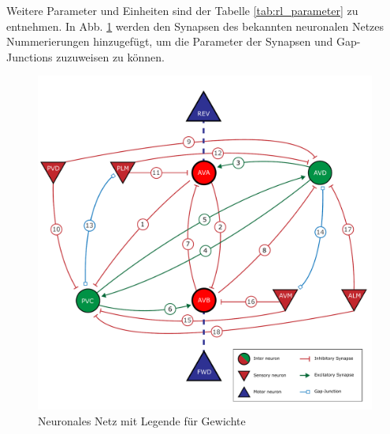 	Weitere Parameter und Einheiten sind der Tabelle \ref{tab:rl_parameter} zu entnehmen. In Abb. \ref{fig:erg_rs_flow} werden den Synapsen des bekannten neuronalen Netzes Nummerierungen hinzugefügt, um die Parameter der Synapsen und Gap-Junctions zuzuweisen zu können.
	\begin{figure}[H]
		\centering
		\includegraphics[width=12cm]{figures/appendix/Neural_Net_v3_num_syn.pdf}
		\caption{Neuronales Netz mit Legende für Gewichte}
		\label{fig:erg_rs_flow}
	\end{figure}

